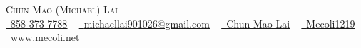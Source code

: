 
\begin{center}
    {\huge \scshape Chun-Mao (Michael) Lai} \\ \vspace{0pt}
    \href{tel:858-373-7788}{\raisebox{-0.1\height}\faPhone\ \underline{858-373-7788}} ~ 
    \href{mailto:michaellai901026@gmail.com}{\raisebox{-0.1\height}\faEnvelope\  \underline{michaellai901026@gmail.com}} ~ 
    \href{https://www.linkedin.com/in/chun-mao-lai-aa1966229}{\raisebox{-0.1\height}\faLinkedin\ \underline{Chun-Mao Lai}}  ~
    \href{https://github.com/Mecoli1219}{\raisebox{-0.1\height}\faGithub\ \underline{Mecoli1219}}~
    \href{https://www.mecoli.net}{\raisebox{-0.1\height}\faHome\ \underline{www.mecoli.net}}\\
    \vspace{-8pt}
\end{center}